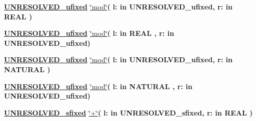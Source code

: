 \begin{DoxyCompactItemize}
\item 
{\bfseries {\bfseries {\bfseries \hyperlink{classfixed__pkg_ae78bc2b36d22f6abeac163955e8a587d}{U\+N\+R\+E\+S\+O\+L\+V\+E\+D\+\_\+ufixed}} \textcolor{vhdlchar}{ }}} \hyperlink{classfixed__pkg_adcb31bd19e000188752c17ad006b956d}{\char`\"{}mod\char`\"{}}{\bfseries  ( }{\bfseries \textcolor{vhdlchar}{l\+: }\textcolor{stringliteral}{in }\textcolor{vhdlchar}{U\+N\+R\+E\+S\+O\+L\+V\+E\+D\+\_\+ufixed}}{\bfseries  , \textcolor{vhdlchar}{r\+: }\textcolor{stringliteral}{in }{\bfseries \textcolor{comment}{R\+E\+A\+L}\textcolor{vhdlchar}{ }}}{\bfseries  )} 
\item 
{\bfseries {\bfseries {\bfseries \hyperlink{classfixed__pkg_ae78bc2b36d22f6abeac163955e8a587d}{U\+N\+R\+E\+S\+O\+L\+V\+E\+D\+\_\+ufixed}} \textcolor{vhdlchar}{ }}} \hyperlink{classfixed__pkg_adcb31bd19e000188752c17ad006b956d}{\char`\"{}mod\char`\"{}}{\bfseries  ( }{\bfseries \textcolor{vhdlchar}{l\+: }\textcolor{stringliteral}{in }{\bfseries \textcolor{comment}{R\+E\+A\+L}\textcolor{vhdlchar}{ }}}{\bfseries  , \textcolor{vhdlchar}{r\+: }\textcolor{stringliteral}{in }\textcolor{vhdlchar}{U\+N\+R\+E\+S\+O\+L\+V\+E\+D\+\_\+ufixed}}{\bfseries  )} 
\item 
{\bfseries {\bfseries {\bfseries \hyperlink{classfixed__pkg_ae78bc2b36d22f6abeac163955e8a587d}{U\+N\+R\+E\+S\+O\+L\+V\+E\+D\+\_\+ufixed}} \textcolor{vhdlchar}{ }}} \hyperlink{classfixed__pkg_adcb31bd19e000188752c17ad006b956d}{\char`\"{}mod\char`\"{}}{\bfseries  ( }{\bfseries \textcolor{vhdlchar}{l\+: }\textcolor{stringliteral}{in }\textcolor{vhdlchar}{U\+N\+R\+E\+S\+O\+L\+V\+E\+D\+\_\+ufixed}}{\bfseries  , \textcolor{vhdlchar}{r\+: }\textcolor{stringliteral}{in }{\bfseries \textcolor{comment}{N\+A\+T\+U\+R\+A\+L}\textcolor{vhdlchar}{ }}}{\bfseries  )} 
\item 
{\bfseries {\bfseries {\bfseries \hyperlink{classfixed__pkg_ae78bc2b36d22f6abeac163955e8a587d}{U\+N\+R\+E\+S\+O\+L\+V\+E\+D\+\_\+ufixed}} \textcolor{vhdlchar}{ }}} \hyperlink{classfixed__pkg_adcb31bd19e000188752c17ad006b956d}{\char`\"{}mod\char`\"{}}{\bfseries  ( }{\bfseries \textcolor{vhdlchar}{l\+: }\textcolor{stringliteral}{in }{\bfseries \textcolor{comment}{N\+A\+T\+U\+R\+A\+L}\textcolor{vhdlchar}{ }}}{\bfseries  , \textcolor{vhdlchar}{r\+: }\textcolor{stringliteral}{in }\textcolor{vhdlchar}{U\+N\+R\+E\+S\+O\+L\+V\+E\+D\+\_\+ufixed}}{\bfseries  )} 
\item 
{\bfseries {\bfseries {\bfseries \hyperlink{classfixed__pkg_aa723b28a027c3c0f9bca02d75e8df4d6}{U\+N\+R\+E\+S\+O\+L\+V\+E\+D\+\_\+sfixed}} \textcolor{vhdlchar}{ }}} \hyperlink{classfixed__pkg_a85a3dc07f1049b4642e6c837673edf13}{\char`\"{}+\char`\"{}}{\bfseries  ( }{\bfseries \textcolor{vhdlchar}{l\+: }\textcolor{stringliteral}{in }\textcolor{vhdlchar}{U\+N\+R\+E\+S\+O\+L\+V\+E\+D\+\_\+sfixed}}{\bfseries  , \textcolor{vhdlchar}{r\+: }\textcolor{stringliteral}{in }{\bfseries \textcolor{comment}{R\+E\+A\+L}\textcolor{vhdlchar}{ }}}{\bfseries  )} 

\end{DoxyCompactItemize}
